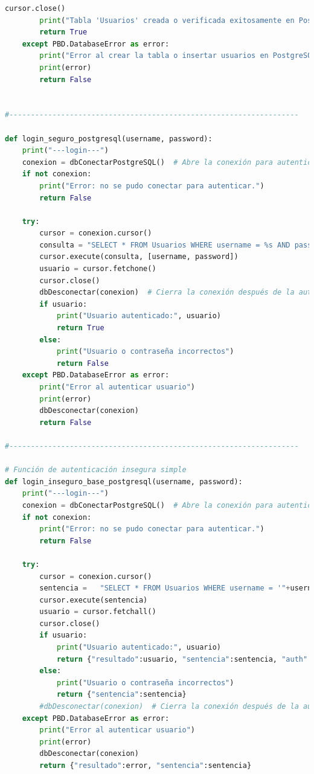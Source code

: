 \documentclass[a4paper,12pt]{article}
\begin{document}
\begin{lstlisting}[language=Python]
        cursor.close()
        print("Tabla 'Usuarios' creada o verificada exitosamente en PostgreSQL")
        return True
    except PBD.DatabaseError as error:
        print("Error al crear la tabla o insertar usuarios en PostgreSQL")
        print(error)
        return False


#-------------------------------------------------------------------

def login_seguro_postgresql(username, password):
    print("---login---")
    conexion = dbConectarPostgreSQL()  # Abre la conexión para autenticación
    if not conexion:
        print("Error: no se pudo conectar para autenticar.")
        return False

    try:
        cursor = conexion.cursor()
        consulta = "SELECT * FROM Usuarios WHERE username = %s AND password = %s"
        cursor.execute(consulta, [username, password])
        usuario = cursor.fetchone()
        cursor.close()
        dbDesconectar(conexion)  # Cierra la conexión después de la autenticación
        if usuario:
            print("Usuario autenticado:", usuario)
            return True
        else:
            print("Usuario o contraseña incorrectos")
            return False
    except PBD.DatabaseError as error:
        print("Error al autenticar usuario")
        print(error)
        dbDesconectar(conexion)
        return False

#-------------------------------------------------------------------

# Función de autenticación insegura simple
def login_inseguro_base_postgresql(username, password):
    print("---login---")
    conexion = dbConectarPostgreSQL()  # Abre la conexión para autenticación
    if not conexion:
        print("Error: no se pudo conectar para autenticar.")
        return False

    try:
        cursor = conexion.cursor()
        sentencia =   "SELECT * FROM Usuarios WHERE username = '"+username+"' AND password = '"+password+"'"
        cursor.execute(sentencia)
        usuario = cursor.fetchall()
        cursor.close()
        if usuario:
            print("Usuario autenticado:", usuario)
            return {"resultado":usuario, "sentencia":sentencia, "auth": "true"}
        else:
            print("Usuario o contraseña incorrectos")
            return {"sentencia":sentencia}
        #dbDesconectar(conexion)  # Cierra la conexión después de la autenticación
    except PBD.DatabaseError as error:
        print("Error al autenticar usuario")
        print(error)
        dbDesconectar(conexion)
        return {"resultado":error, "sentencia":sentencia}


\end{lstlisting}
\end{document}
